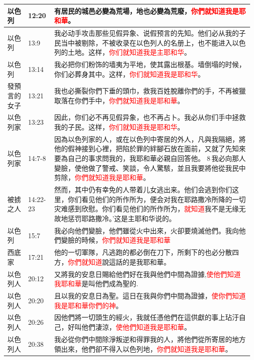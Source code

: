 \begin{table}[H]
\begin{tabular}{p{1.5cm}|p{}|p{14.0cm}}
以色列&12:20&有居民的城邑必變為荒場，地也必變為荒廢，\textcolor{red}{你們就知道我是耶和華}。\\\hline
以色列&13:9&我必动手攻击那些见假异象、说假预言的先知。他们必从我的子民当中被剔除，不被收录在以色列人的名册上，也不能进入以色列的土地。这样，\textcolor{red}{你们就知道我是主耶和华}。\\\hline
以色列&13:14&我必把你们粉饰的墙夷为平地，使其露出根基。墙倒塌的时候，你们必葬身其中。这样，\textcolor{red}{你们就知道我是耶和华}。\\\hline
發預言的女子&13:21&我也必撕裂你們下垂的頭巾，救我百姓脫離你們的手，不再被獵取落在你們手中，\textcolor{red}{你們就知道我是耶和華}。\\\hline

以色列家&13:23&因此，你们必不再见假异象，也不再占卜。我必从你们手中拯救我的子民。这样，\textcolor{red}{你们就知道我是耶和华}。\\\hline
以色列家&14:7-8&因為以色列家的人，或在以色列中寄居的外人，凡與我隔絕，將他的假神接到心裡，把陷於罪的絆腳石放在面前，又就了先知來要為自己的事求問我的，我耶和華必親自回答他。 8 我必向那人變臉，使他做了警戒、笑談，令人驚駭，並且我要將他從我民中剪除，\textcolor{red}{你們就知道我是耶和華}。\\\hline


被掳之人&14:22-23&然而，其中仍有幸免的人带着儿女逃出来。他们会逃到你们这里，你们看见他们的所作所为，便会对我在耶路撒冷所降的一切灾难感到欣慰。你们看见他们的所作所为，\textcolor{red}{就知道}我不是无缘无故地惩罚耶路撒冷。’这是主耶和华说的。\\\hline



以色列&15:7&我必向他們變臉，他們雖從火中出來，火卻要燒滅他們。我向他們變臉的時候，\textcolor{red}{你們就知道我是耶和華}\\\hline

西底家&17:21&他的一切軍隊，凡逃跑的都必倒在刀下，所剩下的也必分散四方，\textcolor{red}{你們就知道}說這話的是我耶和華。\\\hline

以色列人&20:12&又將我的安息日賜給他們好在我與他們中間為證據,\textcolor{red}{使他們知道我耶和華}是叫他們成為聖的.\\\hline
以色列人&20:20&且以我的安息日為聖。這日在我與你們中間為證據，\textcolor{red}{使你們知道我是耶和華你們的神}。
\\\hline

以色列人&20:26&因他們將一切頭生的經火，我就任憑他們在這供獻的事上玷汙自己，好叫他們淒涼，\textcolor{red}{使他們知道我是耶和華}。\\\hline


以色列人&20:38&我必從你們中間除淨叛逆和得罪我的人，將他們從所寄居的地方領出來，他們卻不得入以色列地，\textcolor{red}{你們就知道我是耶和華}。\\\hline

\end{tabular}
\end{table}



